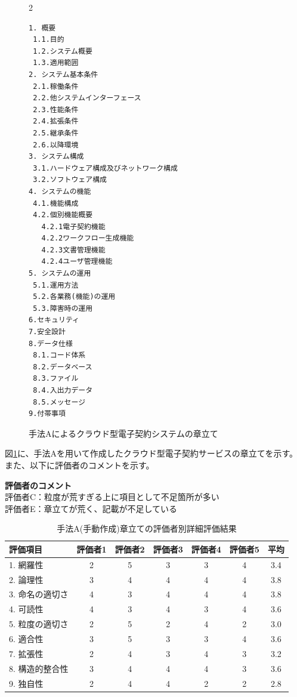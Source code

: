 \begin{figure}[tp]
\begin{tcolorbox}[
  colback=white,
  colframe=orange,
  fonttitle=\bfseries
]
\begin{multicols}{2}
\footnotesize
\ttfamily
\fontsize{8}{9}\selectfont
\begin{verbatim}
1. 概要
 1.1.目的
 1.2.システム概要
 1.3.適用範囲
2. システム基本条件
 2.1.稼働条件
 2.2.他システムインターフェース
 2.3.性能条件
 2.4.拡張条件
 2.5.継承条件
 2.6.以降環境
3. システム構成
 3.1.ハードウェア構成及びネットワーク構成
 3.2.ソフトウェア構成
4. システムの機能
 4.1.機能構成
 4.2.個別機能概要
   4.2.1電子契約機能
   4.2.2ワークフロー生成機能
   4.2.3文書管理機能
   4.2.4ユーザ管理機能
5. システムの運用
 5.1.運用方法
 5.2.各業務(機能)の運用
 5.3.障害時の運用
6.セキュリティ
7.安全設計
8.データ仕様
 8.1.コード体系
 8.2.データベース
 8.3.ファイル
 8.4.入出力データ
 8.5.メッセージ
9.付帯事項
\end{verbatim}
\end{multicols}
\end{tcolorbox}
\caption{手法Aによるクラウド型電子契約システムの章立て}
\label{fig:A_chapter_structure_of_cloud_contract_system}
\end{figure}


図\ref{fig:A_chapter_structure_of_cloud_contract_system}に、手法Aを用いて作成したクラウド型電子契約サービスの章立てを示す。
また、以下に評価者のコメントを示す。

\noindent\textbf{評価者のコメント}\\
評価者C：粒度が荒すぎる上に項目として不足箇所が多い\\
評価者E：章立てが荒く、記載が不足している\\

\begin{table}[tp]
  \caption{手法A(手動作成)章立ての評価者別詳細評価結果}
  \label{tb:cloud_detailed_evaluation_results_A}
  \centering
  \begin{tabular}{|l|c|c|c|c|c|c|}
    \hline
    \textbf{評価項目} & \textbf{評価者1} & \textbf{評価者2} & \textbf{評価者3} & \textbf{評価者4} & \textbf{評価者5} & \textbf{平均} \\
    \hline\hline
    1. 網羅性 & 2 & 5 & 3 & 3 & 4 & 3.4 \\
    \hline
    2. 論理性 & 3 & 4 & 4 & 4 & 4 & 3.8 \\
    \hline
    3. 命名の適切さ & 4 & 3 & 4 & 4 & 4 & 3.8 \\
    \hline
    4. 可読性 & 4 & 3 & 4 & 3 & 4 & 3.6 \\
    \hline
    5. 粒度の適切さ & 2 & 5 & 2 & 4 & 2 & 3.0 \\
    \hline
    6. 適合性 & 3 & 5 & 3 & 3 & 4 & 3.6 \\
    \hline
    7. 拡張性 & 2 & 4 & 3 & 4 & 3 & 3.2 \\
    \hline
    8. 構造的整合性 & 3 & 4 & 4 & 4 & 3 & 3.6 \\
    \hline
    9. 独自性 & 2 & 4 & 4 & 2 & 2 & 2.8 \\
    \hline
  \end{tabular}
\end{table}

